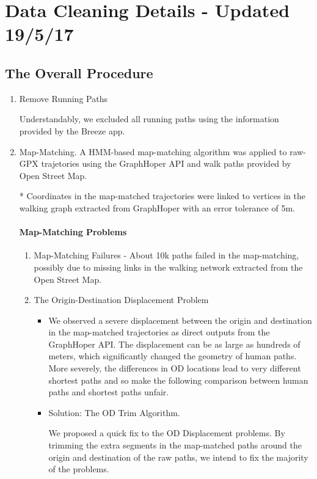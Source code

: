 \documentclass{article}
\begin{document}
\section{Data Cleaning Details - Updated 19/5/17}
\subsection{The Overall Procedure}
\begin{enumerate}
    \item Remove Running Paths

    Understandably, we excluded all running paths using the information provided by the Breeze app. 

    \item Map-Matching.
    A HMM-based map-matching algorithm was applied to raw-GPX trajetories using the GraphHoper API and walk paths provided by Open Street Map.
    
    * Coordinates in the map-matched trajectories were linked to vertices in the walking graph extracted from GraphHoper with an error tolerance of 5m. 
    
    \paragraph{Map-Matching Problems}
    \begin{enumerate}
        \item Map-Matching Failures - About 10k paths failed in the map-matching, possibly due to missing links in the walking network extracted from the Open Street Map. 
            
        \item The Origin-Destination Displacement Problem
            \begin{itemize}
                \item We observed a severe displacement between the origin and destination in the map-matched trajectories as direct outputs from the GraphHoper API. The displacement can be as large as hundreds of meters, which significantly changed the geometry of human paths. More severely, the differences in OD locations lead to very different shortest paths and so make the following comparison between human paths and shortest paths unfair. 
                
                \item Solution: The OD Trim Algorithm.
                
                We proposed a quick fix to the OD Displacement problems. By trimming the extra segments in the map-matched paths around the origin and destination of the raw paths, we intend to fix the majority of the problems. 
                

\end{itemize}
\end{enumerate}
\end{enumerate}
\end{document}
